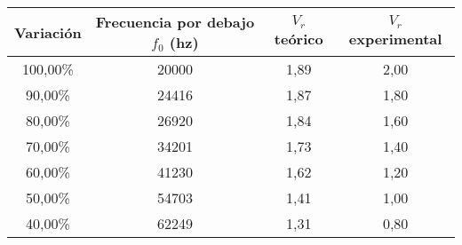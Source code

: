 \begin{tabular}{|c|c|c|c|}
\hline
Variación	&Frecuencia por debajo $f_0$ (hz)	&$V_r$ teórico	&$V_r$ experimental	\\ \hline
100,00\%	&20000	&1,89	&2,00	\\
90,00\%	&24416	&1,87	&1,80	\\
80,00\%	&26920	&1,84	&1,60	\\
70,00\%	&34201	&1,73	&1,40	\\
60,00\%	&41230	&1,62	&1,20	\\
50,00\%	&54703	&1,41	&1,00	\\
40,00\%	&62249	&1,31	&0,80	\\\hline
\end{tabular}

